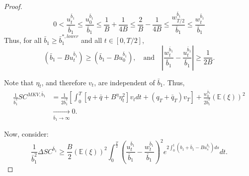 \documentclass[11pt]{article}
\begin{document}
\begin{proof}
	\begin{equation*}
	    0< \frac{u_t^{\bar{b}_1}}{\bar{b}_1} \leq \frac{u_0^{\bar{b}_1}}{\bar{b}_1} \leq \frac{1}{B} + \frac{1}{4B}  \leq \frac{2}{B} - \frac{1}{4 B} \leq \frac{w_{T/2}^{\bar{b}_1}}{ \bar{b}_1} \leq \frac{w_t^{\bar{b}_1}}{\bar{b}_1} 
	\end{equation*}
	Thus, for all $\bar{b}_1 \geq \bar{b}_1^{*,lower}$ and all $t \in [0,T/2]$,
	\begin{equation*}
	 (\bar{b}_1-B u_t^{\bar{b}_1})\geq (\bar{b}_1-B u_{0}^{\bar{b}_1}), \quad \text{and} \quad \left\vert  \frac{w^{\bar{b}_1}_t}{\bar{b}_1}-\frac{u^{\bar{b}_1}_t}{\bar{b}_1} \right\vert \geq \frac{1}{2B}.
	\end{equation*}
	
	Note that $\eta_t$, and therefore $v_t$, are independent of $\bar{b}_1$. Thus,
	\begin{equation*}
	\begin{split}
	\frac{1}{\bar{b}_1^2}SC^{MKV,\bar{b}_1}&=\frac{1}{2\bar{b}_1^2}\left[\int_0^T \left[q+\bar{q} + B^{\eta} \eta_t^2 \right] v_t dt + (q_T + \bar{q}_T) v_T\right] + \frac{w^{\bar{b}_1}_0}{2\bar{b}_1^2} (\mathbb{E}(\xi))^2 \\
	&\xrightarrow[\bar{b}_1 \to \infty]{}0.	
	\end{split}
	\end{equation*}

	Now, consider:
	\begin{equation}
	\frac{1}{\bar{b}_1^2}\Delta SC^{\bar{b}_1}\geq \frac{B}{2}(\mathbb{E}(\xi))^2\int_{0}^{\frac{T}{2}} \left(\frac{u_t^{\bar{b}_1}}{\bar{b}_1} - \frac{w_t^{\bar{b}_1}}{\bar{b}_1}\right)^2 e^{2\int_0^t (b_1+\bar{b}_1-B u_s^{\bar{b}_1})ds} dt.
	\label{eq:prop_7_case_4_numerator}
	\end{equation}
	
	

\end{proof}
\end{document}
